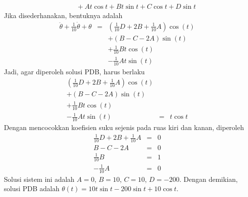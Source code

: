 \begin{description}
\begin{eqnarray*}
 &  & \quad+At\cos t+Bt\sin t+C\cos t+D\sin t
\end{eqnarray*}
Jika disederhanakan, bentuknya adalah
\begin{eqnarray*}
\ddot{\theta}+\frac{1}{10}\dot{\theta}+\theta & = & \left(\frac{1}{10}D+2B+\frac{1}{10}A\right)\cos(t)\\
 &  & +\left(B-C-2A\right)\sin(t)\\
 &  & +\frac{1}{10}Bt\cos(t)\\
 &  & -\frac{1}{10}At\sin(t)
\end{eqnarray*}
Jadi, agar diperoleh solusi PDB, harus berlaku 
\begin{eqnarray*}
\left(\frac{1}{10}D+2B+\frac{1}{10}A\right)\cos(t)\\
+\left(B-C-2A\right)\sin(t)\\
+\frac{1}{10}Bt\cos(t)\\
-\frac{1}{10}At\sin(t) & = & t\cos t
\end{eqnarray*}
Dengan mencocokkan koefisien suku sejenis pada ruas kiri dan kanan,
diperoleh
\begin{eqnarray*}
\frac{1}{10}D+2B+\frac{1}{10}A & = & 0\\
B-C-2A & = & 0\\
\frac{1}{10}B & = & 1\\
-\frac{1}{10}A & = & 0
\end{eqnarray*}
Solusi sistem ini adalah $A=0$, $B=10$, $C=10$, $D=-200$. Dengan
demikian, solusi PDB adalah $\theta(t)=10t\sin t-200\sin t+10\cos t$.
\end{description}

